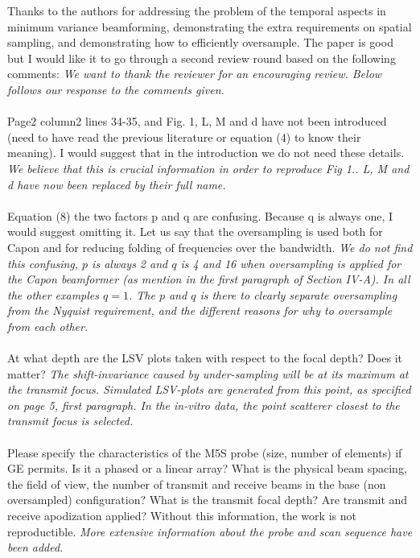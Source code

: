 \documentclass{article}
\begin{document}
Thanks to the authors for addressing the problem of the temporal aspects in minimum variance beamforming, demonstrating the extra requirements on spatial sampling, and demonstrating how to efficiently oversample. The paper is good but I would like it to go through a second review round based on the following comments:
\textit{We want to thank the reviewer for an encouraging review. Below follows our response to the comments given.}
\\\\
Page2 column2 lines 34-35, and Fig. 1, L, M and d have not been introduced (need to have read the previous literature or equation (4) to know their meaning). I would suggest that in the introduction we do not need these details.
\textit{We believe that this is crucial information in order to reproduce Fig 1.. L, M and d have now been replaced by their full name.}
\\\\
Equation (8) the two factors p and q are confusing. Because q is always one, I would suggest omitting it.  Let us say that the oversampling is used both for Capon and for reducing folding of frequencies over the bandwidth.
\textit{We do not find this confusing, $p$ is always 2 and $q$ is 4 and 16 when oversampling is applied for the Capon beamformer (as mention in the first paragraph of Section IV-A). In all the other examples $q=1$. The $p$ and $q$ is there to clearly separate oversampling from the Nyquist requirement, and the different reasons for why to oversample from each other.}
\\\\
At what depth are the LSV plots taken with respect to the focal depth? Does it matter?
\textit{The shift-invariance caused by under-sampling will be at its maximum at the transmit focus. Simulated LSV-plots are generated from this point, as specified on page 5, first paragraph. In the in-vitro data, the point scatterer closest to the transmit focus is selected.}
\\\\
Please specify the characteristics of the M5S probe (size, number of elements) if GE permits. Is it a phased or a linear array? What is the physical beam spacing, the field of view, the number of transmit and receive beams in the base (non oversampled) configuration? What is the transmit focal depth? Are transmit and receive apodization applied? Without this information, the work is not reproductible.
\textit{More extensive information about the probe and scan sequence have been added.}
\\\\
\end{document}
